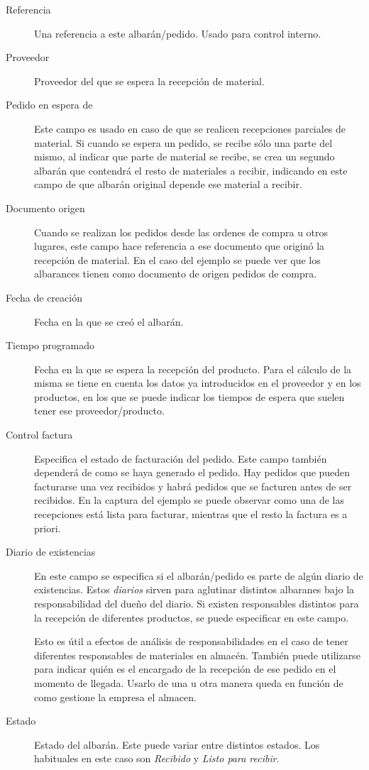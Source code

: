 \begin{description}
  \item[Referencia] 
    Una referencia a este albarán/pedido. Usado para control interno. 
  \item[Proveedor] 
    Proveedor del que se espera la recepción de material.
  \item[Pedido en espera de]
    Este campo es usado en caso de que se realicen recepciones parciales de material. Si cuando se espera un pedido, se recibe sólo una parte del mismo, al indicar que parte de material se recibe, se crea un segundo albarán que contendrá el resto de materiales a recibir, indicando en este campo de que albarán original depende ese material a recibir.
  \item[Documento origen] 
    Cuando se realizan los pedidos desde las ordenes de compra u otros lugares, este campo hace referencia a ese documento que originó la recepción de material. En el caso del ejemplo se puede ver que los albarances tienen como documento de origen pedidos de compra.
  \item[Fecha de creación] 
    Fecha en la que se creó el albarán.
  \item[Tiempo programado] 
    Fecha en la que se espera la recepción del producto. Para el cálculo de la misma se tiene en cuenta los datos ya introducidos en el proveedor y en los productos, en los que se puede indicar los tiempos de espera que suelen tener ese proveedor/producto.
  \item[Control factura] 
    Especifica el estado de facturación del pedido. Este campo también dependerá de como se haya generado el pedido. Hay pedidos que pueden facturarse una vez recibidos y habrá pedidos que se facturen antes de ser recibidos. En la captura del ejemplo se puede observar como una de las recepciones está lista para facturar, mientras que el resto la factura es a priori.
  \item[Diario de existencias] 
    En este campo se especifica si el albarán/pedido es parte de algún diario de existencias. Estos \emph{diarios} sirven para aglutinar distintos albaranes bajo la responsabilidad del dueño del diario. Si existen responsables distintos para la recepción de diferentes productos, se puede especificar en este campo. 

Esto es útil a efectos de análisis de responsabilidades en el caso de tener diferentes responsables de materiales en almacén. También puede utilizarse para indicar quién es el encargado de la recepción de ese pedido en el momento de llegada. Usarlo de una u otra manera queda en función de como gestione la empresa el almacen.
  \item[Estado] 
    Estado del albarán. Este puede variar entre distintos estados. Los habituales en este caso son \emph{Recibido} y \emph{Listo para recibir}.
\end{description}

